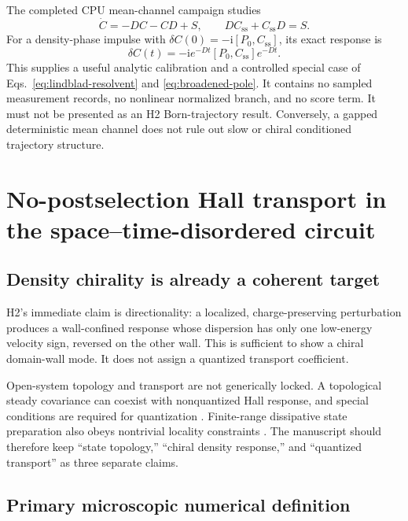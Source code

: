 \documentclass[aps,prb,onecolumn,nofootinbib,superscriptaddress]{revtex4-2}
\newcommand{\ii}{\mathrm{i}}
\newcommand{\ssub}{\mathrm{ss}}
\begin{document}
The completed CPU mean-channel campaign studies
\begin{equation}
  \dot C=-DC-CD+S,
  \qquad D C_{\ssub}+C_{\ssub}D=S.
  \label{eq:mean-channel}
\end{equation}
For a density-phase impulse with
$\delta C(0)=-\ii[P_0,C_{\ssub}]$, its exact response is
\begin{equation}
  \delta C(t)=-\ii e^{-Dt}[P_0,C_{\ssub}]e^{-Dt}.
  \label{eq:mean-channel-response}
\end{equation}
This supplies a useful analytic calibration and a controlled special case of
Eqs.~\eqref{eq:lindblad-resolvent} and \eqref{eq:broadened-pole}.  It contains
no sampled measurement records, no nonlinear normalized branch, and no score
term.  It must not be presented as an H2 Born-trajectory result.  Conversely,
a gapped deterministic mean channel does not rule out slow or chiral
conditioned trajectory structure.

\section{No-postselection Hall transport in the space--time-disordered circuit}
\label{sec:quantization}

\subsection{Density chirality is already a coherent target}

H2's immediate claim is directionality: a localized, charge-preserving
perturbation produces a wall-confined response whose dispersion has only one
low-energy velocity sign, reversed on the other wall.  This is sufficient to
show a chiral domain-wall mode.  It does not assign a quantized transport
coefficient.

Open-system topology and transport are not generically locked.  A topological
steady covariance can coexist with nonquantized Hall response, and special
conditions are required for quantization
\cite{ShavitGoldstein2020,AlbertBradlynFraasJiang2016}.  Finite-range
dissipative state preparation also obeys nontrivial locality constraints
\cite{Goldstein2019}.  The manuscript should therefore keep ``state
topology,'' ``chiral density response,'' and ``quantized transport'' as three
separate claims.

\subsection{Primary microscopic numerical definition}
\end{document}
